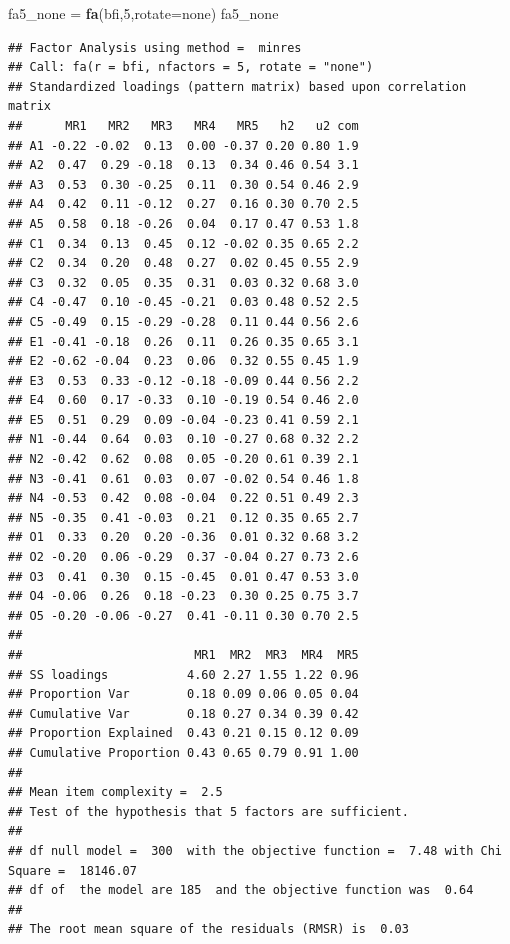 \documentclass[
]{ctexart}
\newenvironment{Shaded}{\begin{snugshade}}{\end{snugshade}}
\newcommand{\AttributeTok}[1]{\textcolor[rgb]{0.13,0.29,0.53}{#1}}
\newcommand{\DecValTok}[1]{\textcolor[rgb]{0.00,0.00,0.81}{#1}}
\newcommand{\FunctionTok}[1]{\textcolor[rgb]{0.13,0.29,0.53}{\textbf{#1}}}
\newcommand{\NormalTok}[1]{#1}
\newcommand{\OtherTok}[1]{\textcolor[rgb]{0.56,0.35,0.01}{#1}}
\newcommand{\StringTok}[1]{\textcolor[rgb]{0.31,0.60,0.02}{#1}}
\begin{document}
\begin{Shaded}
\begin{Highlighting}[]
\NormalTok{fa5\_none }\OtherTok{=} \FunctionTok{fa}\NormalTok{(bfi,}\DecValTok{5}\NormalTok{,}\AttributeTok{rotate=}\StringTok{\textquotesingle{}none\textquotesingle{}}\NormalTok{)  }
\NormalTok{fa5\_none}
\end{Highlighting}
\end{Shaded}

\begin{verbatim}
## Factor Analysis using method =  minres
## Call: fa(r = bfi, nfactors = 5, rotate = "none")
## Standardized loadings (pattern matrix) based upon correlation matrix
##      MR1   MR2   MR3   MR4   MR5   h2   u2 com
## A1 -0.22 -0.02  0.13  0.00 -0.37 0.20 0.80 1.9
## A2  0.47  0.29 -0.18  0.13  0.34 0.46 0.54 3.1
## A3  0.53  0.30 -0.25  0.11  0.30 0.54 0.46 2.9
## A4  0.42  0.11 -0.12  0.27  0.16 0.30 0.70 2.5
## A5  0.58  0.18 -0.26  0.04  0.17 0.47 0.53 1.8
## C1  0.34  0.13  0.45  0.12 -0.02 0.35 0.65 2.2
## C2  0.34  0.20  0.48  0.27  0.02 0.45 0.55 2.9
## C3  0.32  0.05  0.35  0.31  0.03 0.32 0.68 3.0
## C4 -0.47  0.10 -0.45 -0.21  0.03 0.48 0.52 2.5
## C5 -0.49  0.15 -0.29 -0.28  0.11 0.44 0.56 2.6
## E1 -0.41 -0.18  0.26  0.11  0.26 0.35 0.65 3.1
## E2 -0.62 -0.04  0.23  0.06  0.32 0.55 0.45 1.9
## E3  0.53  0.33 -0.12 -0.18 -0.09 0.44 0.56 2.2
## E4  0.60  0.17 -0.33  0.10 -0.19 0.54 0.46 2.0
## E5  0.51  0.29  0.09 -0.04 -0.23 0.41 0.59 2.1
## N1 -0.44  0.64  0.03  0.10 -0.27 0.68 0.32 2.2
## N2 -0.42  0.62  0.08  0.05 -0.20 0.61 0.39 2.1
## N3 -0.41  0.61  0.03  0.07 -0.02 0.54 0.46 1.8
## N4 -0.53  0.42  0.08 -0.04  0.22 0.51 0.49 2.3
## N5 -0.35  0.41 -0.03  0.21  0.12 0.35 0.65 2.7
## O1  0.33  0.20  0.20 -0.36  0.01 0.32 0.68 3.2
## O2 -0.20  0.06 -0.29  0.37 -0.04 0.27 0.73 2.6
## O3  0.41  0.30  0.15 -0.45  0.01 0.47 0.53 3.0
## O4 -0.06  0.26  0.18 -0.23  0.30 0.25 0.75 3.7
## O5 -0.20 -0.06 -0.27  0.41 -0.11 0.30 0.70 2.5
## 
##                        MR1  MR2  MR3  MR4  MR5
## SS loadings           4.60 2.27 1.55 1.22 0.96
## Proportion Var        0.18 0.09 0.06 0.05 0.04
## Cumulative Var        0.18 0.27 0.34 0.39 0.42
## Proportion Explained  0.43 0.21 0.15 0.12 0.09
## Cumulative Proportion 0.43 0.65 0.79 0.91 1.00
## 
## Mean item complexity =  2.5
## Test of the hypothesis that 5 factors are sufficient.
## 
## df null model =  300  with the objective function =  7.48 with Chi Square =  18146.07
## df of  the model are 185  and the objective function was  0.64 
## 
## The root mean square of the residuals (RMSR) is  0.03 

\end{verbatim}
\end{document}
